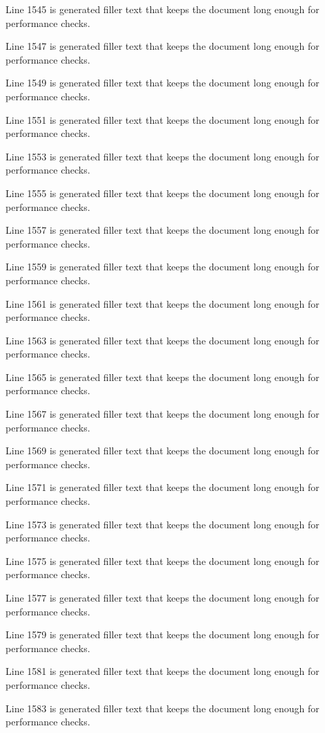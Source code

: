 Line 1545 is generated filler text that keeps the document long enough for performance checks.

Line 1547 is generated filler text that keeps the document long enough for performance checks.

Line 1549 is generated filler text that keeps the document long enough for performance checks.

Line 1551 is generated filler text that keeps the document long enough for performance checks.

Line 1553 is generated filler text that keeps the document long enough for performance checks.

Line 1555 is generated filler text that keeps the document long enough for performance checks.

Line 1557 is generated filler text that keeps the document long enough for performance checks.

Line 1559 is generated filler text that keeps the document long enough for performance checks.

Line 1561 is generated filler text that keeps the document long enough for performance checks.

Line 1563 is generated filler text that keeps the document long enough for performance checks.

Line 1565 is generated filler text that keeps the document long enough for performance checks.

Line 1567 is generated filler text that keeps the document long enough for performance checks.

Line 1569 is generated filler text that keeps the document long enough for performance checks.

Line 1571 is generated filler text that keeps the document long enough for performance checks.

Line 1573 is generated filler text that keeps the document long enough for performance checks.

Line 1575 is generated filler text that keeps the document long enough for performance checks.

Line 1577 is generated filler text that keeps the document long enough for performance checks.

Line 1579 is generated filler text that keeps the document long enough for performance checks.

Line 1581 is generated filler text that keeps the document long enough for performance checks.

Line 1583 is generated filler text that keeps the document long enough for performance checks.

